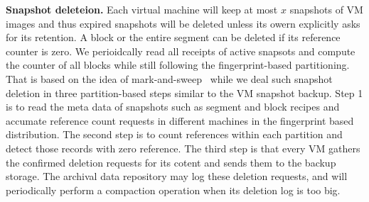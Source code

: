 {\bf Snapshot deleteion.} Each virtual machine will keep at most $x$ snapshots of VM images and thus
expired snapshots will be deleted unless its owern explicitly asks for its retention. 
A block or the entire segment can be deleted if its reference counter is zero.
We perioidcally read all receipts of active 
snapsots and compute the counter of all blocks while still following the fingerprint-based partitioning.
That is based on the idea of mark-and-sweep~\cite{MarkSweep} while 
we deal such snapshot deletion in three partition-based steps similar to the VM snapshot backup.
Step 1 is to read  the meta data of snapshots such as segment and block
recipes and  accumate  reference count requests in different machines  in the fingerprint based distribution.
The second step  is to count references within each partition and detect those records with zero 
reference. The third step is that every VM gathers the confirmed deletion requests for its cotent and sends them
to the backup storage.
The archival data repository may log these deletion requests,  and will periodically perform a compaction operation when 
its deletion log is too big. 




